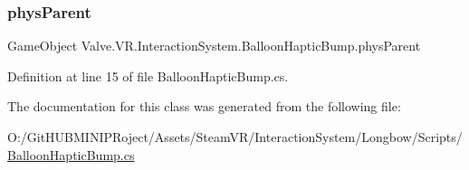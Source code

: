 \subsubsection{\texorpdfstring{physParent}{physParent}}
{\footnotesize\ttfamily Game\+Object Valve.\+V\+R.\+Interaction\+System.\+Balloon\+Haptic\+Bump.\+phys\+Parent}



Definition at line 15 of file Balloon\+Haptic\+Bump.\+cs.



The documentation for this class was generated from the following file\+:\begin{DoxyCompactItemize}
\item 
O\+:/\+Git\+H\+U\+B\+M\+I\+N\+I\+P\+Roject/\+Assets/\+Steam\+V\+R/\+Interaction\+System/\+Longbow/\+Scripts/\mbox{\hyperlink{_balloon_haptic_bump_8cs}{Balloon\+Haptic\+Bump.\+cs}}\end{DoxyCompactItemize}
